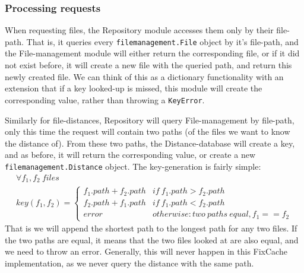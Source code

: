 \documentclass[12pt,twoside,notitlepage]{report}
\newcommand{\fxch}{FixCache}
\begin{document}
\subsubsection*{Processing requests}
When requesting files, the Repository module accesses them only by their file-path. That is, it queries every \texttt{filemanagement.File} object by it's file-path, and the File-management module will either return the corresponding file, or if it did not exist before, it will create a new file with the queried path, and return this newly created file. We can think of this as a dictionary functionality with an extension that if a key looked-up is missed, this module will create the corresponding value, rather than throwing a \texttt{KeyError}.

Similarly for file-distances, Repository will query File-management by file-path, only this time the request will contain two paths (of the files we want to know the distance of). From these two paths, the Distance-database will create a key, and as before, it will return the corresponding value, or create a new \texttt{filemanagement.Distance} object. The key-generation is fairly simple:
\begin{gather*}\label{distance_key} 
	\forall f_1, f_2\ files \\
	key(f_1, f_2) = \begin{cases}
						f_1.path+f_2.path &if\ f_1.path > f_2.path\\
						f_2.path+f_1.path &if\ f_1.path < f_2.path\\
						error &otherwise: two\ paths\ equal, f_1 == f_2
					\end{cases}
\end{gather*}
That is we will append the shortest path to the longest path for any two files. If the two paths are equal, it means that the two files looked at  are also equal, and we need to throw an error. Generally, this will never happen in this \fxch{} implementation, as we never query the distance with the same path.
\end{document}
